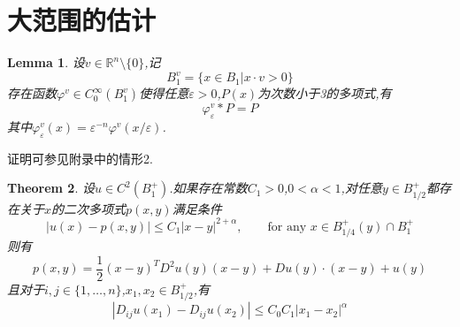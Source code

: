 \documentclass[12pt,A4paper,reqno]{amsart}
\numberwithin{equation}{section}
\theoremstyle{plain}
\newtheorem{theorem}{Theorem}[section]
\newtheorem{lemma}[theorem]{Lemma}
\theoremstyle{plain}
\theoremstyle{plain}
\numberwithin{equation}{section}
\theoremstyle{remark}
\begin{document}
\section{大范围的估计}
\begin{lemma}
	设$v \in \mathbb{R}^n \setminus \{0\}$,记
	$$B_1^{v}=\{x \in B_1 \vert x \cdot v >0\}$$
	存在函数$\varphi^v \in C_{0}^{\infty}\left(B_{1}^{v}\right)$使得任意$\varepsilon >0$,$P(x)$为次数小于3的多项式,有$$\varphi^v_{\varepsilon} * P=P$$
	其中$\varphi^v_{\varepsilon}(x)=\varepsilon^{-n} \varphi^v(x / \varepsilon)$.
\end{lemma}
证明可参见\cite{周蜀林2019Schauder}附录中的情形2.
\begin{theorem}\label{thm:dafan}
	设$u \in C^2(B_1^{+})$.如果存在常数$C_1>0$,$0< \alpha <1$,对任意$y \in B_{1/2}^{+}$都存在关于$x$的二次多项式$p(x,y)$满足条件
	$$
	|u(x)-p(x, y)| \leq C_{1}|x-y|^{2+\alpha}, \qquad \text{for any }x \in B_{1/4}^{+}(y) \cap B_1^{+}
	$$
	则有
	\begin{equation}
			p(x, y)=\frac{1}{2}(x-y)^{T} D^{2} u(y)(x-y)+D u(y) \cdot(x-y)+u(y)
	\end{equation}
且对于$i,j \in \{1,\ldots,n\}$,$x_1,x_2 \in B_{1/2}^{+}$,有
	\begin{equation}\label{eq:D<x}
\left|D_{i j} u\left(x_{1}\right)-D_{i j} u\left(x_{2}\right)\right| \leq C_0C_{1}\left|x_{1}-x_{2}\right|^{\alpha}
\end{equation}
\end{theorem}
\end{document}
